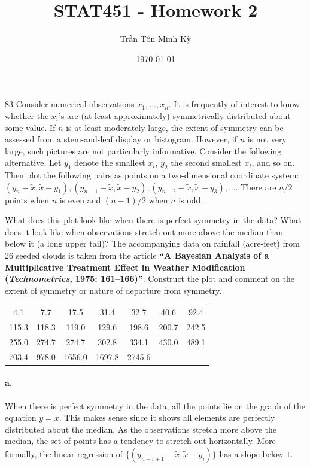 \documentclass{exam}
\title{STAT451 - Homework 2}
\author{\foreignlanguage{vietnamese}{Trần Tôn Minh Kỳ}}
\date{\today}
\begin{document}
\maketitle

\begin{problem}{83}
	Consider numerical observations $x_1, \dots, x_n$. It is frequently of interest to know whether the $x_i$'s are (at least approximately) symmetrically distributed about some value. If $n$ is at least moderately large, the extent of symmetry can be assessed from a stem-and-leaf display or histogram. However, if $n$ is not very large, such pictures are not particularly informative. Consider the following alternative. Let $y_1$ denote the smallest $x_i$, $y_2$ the second smallest $x_i$, and so on. Then plot the following pairs as points on a two-dimensional coordinate system: $(y_n - \widetilde{x}, \widetilde{x} - y_1), (y_{n - 1} - \widetilde{x}, \widetilde{x} - y_2), (y_{n - 2} - \widetilde{x}, \widetilde{x} - y_3), \dots$. There are $n/2$ points when $n$ is even and $(n - 1)/2$ when $n$ is odd.
	\begin{tasks}[label=\textbf{\alph*.}]
		\task What does this plot look like when there is perfect symmetry in the data? What does it look like when observations stretch out more above the median than below it (a long upper tail)?
		\task The accompanying data on rainfall (acre-feet) from 26 seeded clouds is taken from the article \textbf{``A Bayesian Analysis of a Multiplicative Treatment Effect in Weather Modification (\textit{Technometrics}, 1975: 161--166)''}. Construct the plot and comment on the extent of symmetry or nature of departure from symmetry.
		\begin{center}
			\begin{tabular}{ccccccc}
				4.1 & 7.7 & 17.5 & 31.4 & 32.7 & 40.6 & 92.4 \\
				115.3 & 118.3 & 119.0 & 129.6 & 198.6 & 200.7 & 242.5 \\
				255.0 & 274.7 & 274.7 & 302.8 & 334.1 & 430.0 & 489.1 \\
				703.4 & 978.0 & 1656.0 & 1697.8 & 2745.6
			\end{tabular}
		\end{center}
	\end{tasks}
\end{problem}

\paragraph{a.} When there is perfect symmetry in the data, all the points lie on the graph of the equation $y = x$. This makes sense since it shows all elements are perfectly distributed about the median. As the observations stretch more above the median, the set of points has a tendency to stretch out horizontally. More formally, the linear regression of $\{(y_{n - i + 1} - \widetilde{x}, \widetilde{x} - y_i)\}$ has a slope below $1$.
\end{document}
